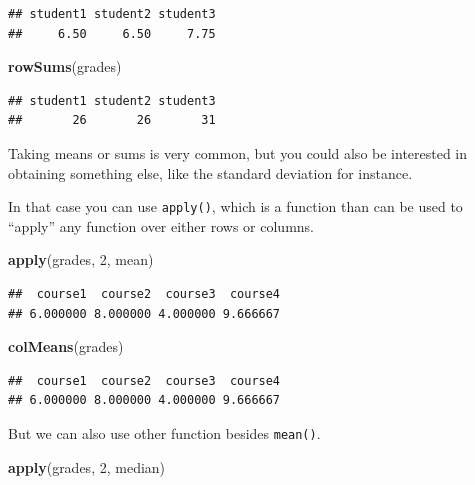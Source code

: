 \documentclass[
]{book}
\newenvironment{Shaded}{\begin{snugshade}}{\end{snugshade}}
\newcommand{\DecValTok}[1]{\textcolor[rgb]{0.00,0.00,0.81}{#1}}
\newcommand{\FunctionTok}[1]{\textcolor[rgb]{0.13,0.29,0.53}{\textbf{#1}}}
\newcommand{\NormalTok}[1]{#1}
\begin{document}
\begin{verbatim}
## student1 student2 student3 
##     6.50     6.50     7.75
\end{verbatim}

\begin{Shaded}
\begin{Highlighting}[]
\FunctionTok{rowSums}\NormalTok{(grades)}
\end{Highlighting}
\end{Shaded}

\begin{verbatim}
## student1 student2 student3 
##       26       26       31
\end{verbatim}

Taking means or sums is very common, but you could also be interested in obtaining something else, like the standard deviation for instance.

In that case you can use \texttt{apply()}, which is a function than can be used to ``apply'' any function over either rows or columns.

\begin{Shaded}
\begin{Highlighting}[]
\FunctionTok{apply}\NormalTok{(grades, }\DecValTok{2}\NormalTok{, mean)}
\end{Highlighting}
\end{Shaded}

\begin{verbatim}
##  course1  course2  course3  course4 
## 6.000000 8.000000 4.000000 9.666667
\end{verbatim}

\begin{Shaded}
\begin{Highlighting}[]
\FunctionTok{colMeans}\NormalTok{(grades)}
\end{Highlighting}
\end{Shaded}

\begin{verbatim}
##  course1  course2  course3  course4 
## 6.000000 8.000000 4.000000 9.666667
\end{verbatim}

But we can also use other function besides \texttt{mean()}.

\begin{Shaded}
\begin{Highlighting}[]
\FunctionTok{apply}\NormalTok{(grades, }\DecValTok{2}\NormalTok{, median)}
\end{Highlighting}
\end{Shaded}
\end{document}
